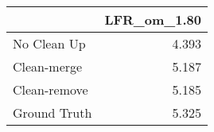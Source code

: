 \begin{tabular}{lr}
\toprule
{} & LFR_om_1.80 \\
\midrule
No Clean Up  &       4.393 \\
Clean-merge  &       5.187 \\
Clean-remove &       5.185 \\
Ground Truth &       5.325 \\
\bottomrule
\end{tabular}
